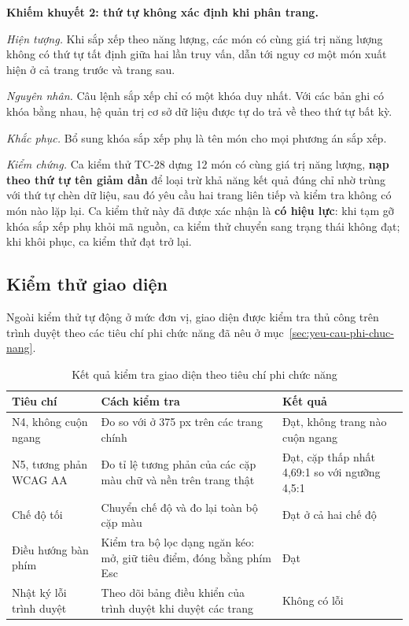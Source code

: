 \noindent\textbf{Khiếm khuyết 2: thứ tự không xác định khi phân trang.}

\textit{Hiện tượng.} Khi sắp xếp theo năng lượng, các món có cùng giá trị năng
lượng không có thứ tự tất định giữa hai lần truy vấn, dẫn tới nguy cơ một món
xuất hiện ở cả trang trước và trang sau.

\textit{Nguyên nhân.} Câu lệnh sắp xếp chỉ có một khóa duy nhất. Với các bản ghi
có khóa bằng nhau, hệ quản trị cơ sở dữ liệu được tự do trả về theo thứ tự bất
kỳ.

\textit{Khắc phục.} Bổ sung khóa sắp xếp phụ là tên món cho mọi phương án sắp
xếp.

\textit{Kiểm chứng.} Ca kiểm thử TC-28 dựng 12 món có cùng giá trị năng lượng,
\textbf{nạp theo thứ tự tên giảm dần} để loại trừ khả năng kết quả đúng chỉ nhờ
trùng với thứ tự chèn dữ liệu, sau đó yêu cầu hai trang liên tiếp và kiểm tra
không có món nào lặp lại. Ca kiểm thử này đã được xác nhận là \textbf{có hiệu
lực}: khi tạm gỡ khóa sắp xếp phụ khỏi mã nguồn, ca kiểm thử chuyển sang trạng
thái không đạt; khi khôi phục, ca kiểm thử đạt trở lại.

\subsection{Kiểm thử giao diện}
\label{sec:kiem-thu-giao-dien}

Ngoài kiểm thử tự động ở mức đơn vị, giao diện được kiểm tra thủ công trên trình
duyệt theo các tiêu chí phi chức năng đã nêu ở
mục~\ref{sec:yeu-cau-phi-chuc-nang}.

\begin{table}[H]
\centering
\caption{Kết quả kiểm tra giao diện theo tiêu chí phi chức năng}
\label{tab:kiem-thu-giao-dien}
\begin{tabularx}{\textwidth}{|P{3.4cm}|Y|Y|}
\hline
\bfseries Tiêu chí & \bfseries Cách kiểm tra & \bfseries Kết quả \\ \hline
N4, không cuộn ngang & Đo  so với  ở 375 px
  trên các trang chính & Đạt, không trang nào cuộn ngang \\ \hline
N5, tương phản WCAG AA & Đo tỉ lệ tương phản của các cặp màu chữ và nền
  trên trang thật & Đạt, cặp thấp nhất 4,69:1 so với ngưỡng 4,5:1 \\ \hline
Chế độ tối & Chuyển chế độ và đo lại toàn bộ cặp màu & Đạt ở cả hai chế độ \\ \hline
Điều hướng bàn phím & Kiểm tra bộ lọc dạng ngăn kéo: mở, giữ tiêu điểm,
  đóng bằng phím Esc & Đạt \\ \hline
Nhật ký lỗi trình duyệt & Theo dõi bảng điều khiển của trình duyệt khi duyệt các
  trang & Không có lỗi \\ \hline
\end{tabularx}
\end{table}

